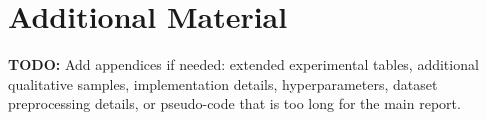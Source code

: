 ﻿\chapter{Additional Material}

\textbf{TODO:} Add appendices if needed: extended experimental tables, additional qualitative samples, implementation details, hyperparameters, dataset preprocessing details, or pseudo-code that is too long for the main report.
